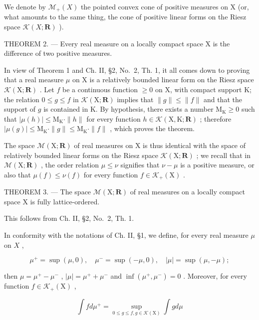 We denote by \(\mathcal{M}_{+}(X)\) the pointed convex cone of positive measures on X (or, what amounts to the same thing, the cone of positive linear forms on the Riesz space \(\mathcal{K}(X;\mathbf{R})\) ).

THEOREM 2. --- Every real measure on a locally compact space X is the difference of two positive measures.

In view of Theorem 1 and Ch. II, §2, No.~2, Th. 1, it all comes down to proving that a real measure \(\mu\) on X is a relatively bounded linear form on the Riesz space \(\mathcal{K}(\mathrm{X};\mathbf{R})\) . Let \(f\) be a continuous function \(\geqslant 0\) on X, with compact support K; the relation \(0 \leqslant g \leqslant f\) in \(\mathcal{K}(\mathrm{X};\mathbf{R})\) implies that \(\|g\| \leqslant \|f\|\) and that the support of \(g\) is contained in K. By hypothesis, there exists a number \(\mathrm{M}_{\mathrm{K}} \geqslant 0\) such that \(|\mu(h)| \leqslant \mathrm{M}_{\mathrm{K}} \cdot \|h\|\) for every function \(h \in \mathcal{K}(\mathrm{X},\mathrm{K};\mathbf{R})\) ; therefore \(|\mu(g)| \leqslant \mathrm{M}_{\mathrm{K}} \cdot \|g\| \leqslant \mathrm{M}_{\mathrm{K}} \cdot \|f\|\) , which proves the theorem.

The space \(\mathcal{M}(\mathrm{X};\mathbf{R})\) of real measures on X is thus identical with the space of relatively bounded linear forms on the Riesz space \(\mathcal{K}(\mathrm{X};\mathbf{R})\) ; we recall that in \(\mathcal{M}(\mathrm{X};\mathbf{R})\) , the order relation \(\mu\leqslant\nu\) signifies that \(\nu-\mu\) is a positive measure, or also that \(\mu(f)\leqslant\nu(f)\) for every function \(f\in\mathcal{K}_{+}(\mathrm{X})\) .

THEOREM 3. --- The space \(\mathcal{M}(\mathrm{X};\mathbf{R})\) of real measures on a locally compact space X is fully lattice-ordered.

This follows from Ch. II, §2, No.~2, Th. 1.

In conformity with the notations of Ch. II, §1, we define, for every real measure \(\mu\) on \(X\) ,

\[
\mu^ {+} = \sup (\mu , 0), \quad \mu^ {-} = \sup (- \mu , 0), \quad | \mu | = \sup (\mu , - \mu);
\]

then \(\mu = \mu^{+} - \mu^{-}\) , \(|\mu| = \mu^{+} + \mu^{-}\) and \(\inf (\mu^{+},\mu^{-}) = 0\) . Moreover, for every function \(f\in \mathcal{K}_{+}(\mathrm{X})\) ,

\[
\int f d \mu^ {+} = \sup _ {0 \leqslant g \leqslant f, g \in \mathcal {K} (\mathrm{X})} \int g d \mu\tag{8}
\]

